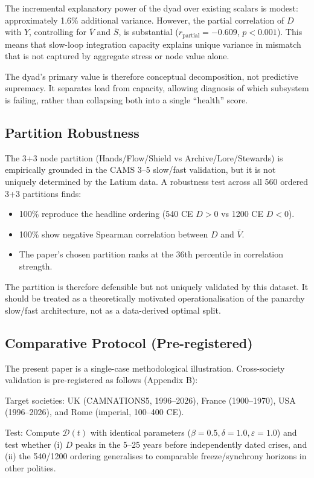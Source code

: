 \documentclass[11pt,a4paper]{article}
\begin{document}
The incremental explanatory power of the dyad over existing scalars is modest: approximately 1.6\% additional variance. However, the partial correlation of \(D\) with \(Y\), controlling for \(\bar{V}\) and \(\bar{S}\), is substantial (\(r_{\text{partial}}=-0.609\), \(p<0.001\)). This means that slow-loop integration capacity explains unique variance in mismatch that is not captured by aggregate stress or node value alone.

The dyad's primary value is therefore conceptual decomposition, not predictive supremacy. It separates load from capacity, allowing diagnosis of which subsystem is failing, rather than collapsing both into a single ``health'' score.

\subsection{Partition Robustness}
The 3+3 node partition (Hands/Flow/Shield vs Archive/Lore/Stewards) is empirically grounded in the CAMS 3--5 slow/fast validation, but it is not uniquely determined by the Latium data. A robustness test across all 560 ordered 3+3 partitions finds:

\begin{itemize}
\item 100\% reproduce the headline ordering (540 CE \(D>0\) vs 1200 CE \(D<0\)).
\item 100\% show negative Spearman correlation between \(D\) and \(\bar{V}\).
\item The paper's chosen partition ranks at the 36th percentile in correlation strength.
\end{itemize}

The partition is therefore defensible but not uniquely validated by this dataset. It should be treated as a theoretically motivated operationalisation of the panarchy slow/fast architecture, not as a data-derived optimal split.

\subsection{Comparative Protocol (Pre-registered)}
The present paper is a single-case methodological illustration. Cross-society validation is pre-registered as follows (Appendix B):

Target societies: UK (CAMNATIONS5, 1996--2026), France (1900--1970), USA (1996--2026), and Rome (imperial, 100--400 CE).

Test: Compute \(\mathcal{D}(t)\) with identical parameters (\(\beta=0.5,\delta=1.0,\varepsilon=1.0\)) and test whether (i) \(D\) peaks in the 5--25 years before independently dated crises, and (ii) the 540/1200 ordering generalises to comparable freeze/synchrony horizons in other polities.
\end{document}
